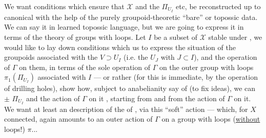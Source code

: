 We want conditions which ensure that $\mathcal{X}$ and the $\Pi_{U_I}$  etc,  be reconstructed up to  canonical  with the help of the purely groupoid-theoretic ``bare'' or topossic   data.  We can say it in learned topossic language, but we are going to express it in terms of the theory of groups with loops. Let $I$ be a subset of $\mathcal{X}$ stable under , we would like to lay down conditions which   us to express  the situation of the groupoids  associated with the $V\supset U_I$ (i.e. the $U_J$ with $J\subset I$),  and the operation of $\Gamma$ on them, in terms of the  sole operation of $\Gamma$ on the outer group with loops  $\pi_1(\Pi_{U_I})$ associated with $I$ ---
\margin{\unsure{$\rightsquigarrow$|$\longrightarrow$}}
or rather (for this is immediate, by the operation of drilling holes),  show how,
subject to anabelianity \unsure{$\zeta$|$\xi$} say of  (to fix ideas), we can $\pm$  $\Pi_{U_I}$ and the action of $\Gamma$ on it ,
starting from   and from the action of $\Gamma$ on it.
We want at least an  description of the  of ,  via
this ``soft'' action --- which, for $X$ connected, again amounts to an outer action of $\Gamma$ on a group with loops (\uline{without} loops!) $\pi$...

